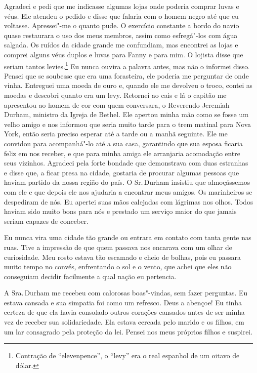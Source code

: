 Agradeci e pedi que me indicasse algumas lojas onde poderia comprar
luvas e véus. Ele atendeu o pedido e disse que falaria com o homem negro
até que eu voltasse. Apressei"-me o quanto pude. O exercício constante a
bordo do navio quase restaurara o uso dos meus membros, assim como
esfregá"-los com água salgada. Os ruídos da cidade grande me confundiam,
mas encontrei as lojas e comprei alguns véus duplos e luvas para Fanny e
para mim. O lojista disse que seriam tantos levies.\footnote{Contração de ``elevenpence'', o ``levy'' era o real espanhol de um
  oitavo de dólar.} Eu nunca ouvira a palavra antes, mas não o informei
disso. Pensei que se soubesse que era uma forasteira, ele poderia me
perguntar de onde vinha. Entreguei uma moeda de ouro e, quando ele me
devolveu o troco, contei as moedas e descobri quanto era um levy.
Retornei ao cais e lá o capitão me apresentou ao homem de cor com quem
conversara, o Reverendo Jeremiah Durham, ministro da Igreja de Bethel.
Ele apertou minha mão como se fosse um velho amigo e nos informou que
seria muito tarde para o trem matinal para Nova York, então seria
preciso esperar até a tarde ou a manhã seguinte. Ele me convidou para
acompanhá"-lo até a sua casa, garantindo que sua esposa ficaria feliz em
nos receber, e que para minha amiga ele arranjaria acomodação entre seus
vizinhos. Agradeci pela forte bondade que demonstrava com duas estranhas
e disse que, a ficar presa na cidade, gostaria de procurar algumas
pessoas que haviam partido da nossa região do país. O Sr.\,Durham
insistiu que almoçássemos com ele e que depois ele nos ajudaria a
encontrar meus amigos. Os marinheiros se despediram de nós. Eu apertei
suas mãos calejadas com lágrimas nos olhos. Todos haviam sido muito bons
para nós e prestado um serviço maior do que jamais seriam capazes de
conceber.

Eu nunca vira uma cidade tão grande ou
entrara em contato com tanta gente nas ruas. Tive a impressão de que
quem passava nos encarava com um olhar de curiosidade. Meu rosto estava
tão escamado e cheio de bolhas, pois eu passara muito tempo no convés,
enfrentando o sol e o vento, que achei que eles não conseguiam decidir
facilmente a qual nação eu pertencia.

A Sra.\,Durham me recebeu com calorosas
boas"-vindas, sem fazer perguntas. Eu estava cansada e sua simpatia foi
como um refresco. Deus a abençoe! Eu tinha certeza de que ela havia
consolado outros corações cansados antes de ser minha vez de receber sua
solidariedade. Ela estava cercada pelo marido e os filhos, em um lar
consagrado pela proteção da lei. Pensei nos meus próprios filhos e
suspirei.

